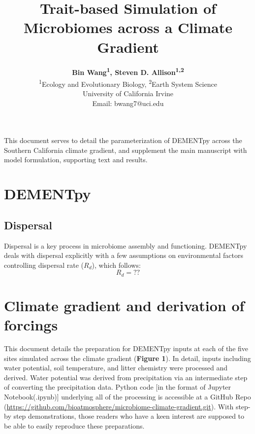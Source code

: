 \documentclass[letterpaper, 10pt]{article}
\begin{document}
\setlength{\droptitle}{-8em} 
\title{\Large\textbf{Trait-based Simulation of Microbiomes across a Climate Gradient}\vspace{-0em}}
\author{\normalsize\textbf{Bin Wang\textsuperscript{1}, Steven D. Allison\textsuperscript{1,2}}\vspace{1em} \\
\textsuperscript{1}Ecology and Evolutionary Biology, \textsuperscript{2}Earth System Science \\
University of California Irvine\vspace{0em} \\
Email: bwang7@uci.edu} 
\maketitle

This document serves to detail the parameterization of DEMENTpy across the Southern California
climate gradient, and supplement the main manuscript with model formulation, supporting text and results.

\section{DEMENTpy}

\subsection{Dispersal}
Dispersal is a key process in microbiome assembly and functioning. DEMENTpy deals with
dispersal explicitly with a few assumptions on environmental factors controlling dispersal rate ($R_{d}$),
which follows:
\begin{equation}
  R_{d} = ?? 
\end{equation}


\section{Climate gradient and derivation of forcings}
This document details the preparation for DEMENTpy inputs at each of the five sites simulated across the climate gradient (\textbf{Figure 1}). In detail, inputs including water potential, soil temperature, and litter chemistry were processed and derived. Water potential was derived from precipitation via an intermediate step of converting the precipitation data. Python code [in the format of Jupyter Notebook(.ipynb)] underlying all of the processing is accessible at a GitHub Repo (\url{https://github.com/bioatmosphere/microbiome-climate-gradient.git}). With step-by step demonstrations, those readers who have a keen interest are supposed to be able to easily reproduce these preparations.
\end{document}
